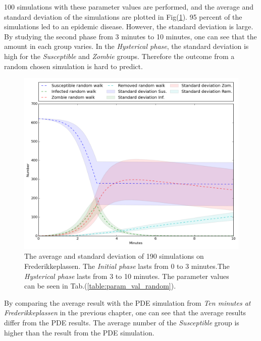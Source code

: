 \documentclass[%
twoside,                 %
final,                   %
chapterprefix=true,      %
open=right               %
10pt]{book}
\begin{document}
100 simulations with these parameter values are performed, and the average and standard deviation of the simulations are plotted in Fig(\ref{fig:walking_dead}). 95 percent of the simulations led to an epidemic disease. However, the standard deviation is large. By studying the second phase from 3 minutes to 10 minutes, one can see that the amount in each group varies. In the \emph{Hysterical phase}, the standard deviation is high for the \emph{Susceptible} and \emph{Zombie} groups. Therefore the outcome from a random chosen simulation is hard to predict.


\begin{figure}[ht]
  \centerline{\includegraphics[width=0.8\linewidth]{3_fig/Walking_dead_Frederikke.png}}
  \caption{
  \label{fig:walking_dead}The average and standard deviation of 190 simulations on Frederikkeplassen. The \emph{Initial phase} lasts from 0 to 3 minutes.The \emph{Hysterical phase} lasts from 3 to 10 minutes. The parameter values can be seen in Tab.(\ref{table:param_val_random}).
  }
\end{figure}


By comparing the average result with the PDE simulation from \emph{Ten minutes at Frederikkeplassen} in the previous chapter, one can see that the average results differ from the PDE results. The average number of the \emph{Susceptible} group is higher than the result from the PDE simulation. 

\label{table:frederikke_table_random}
\end{document}
